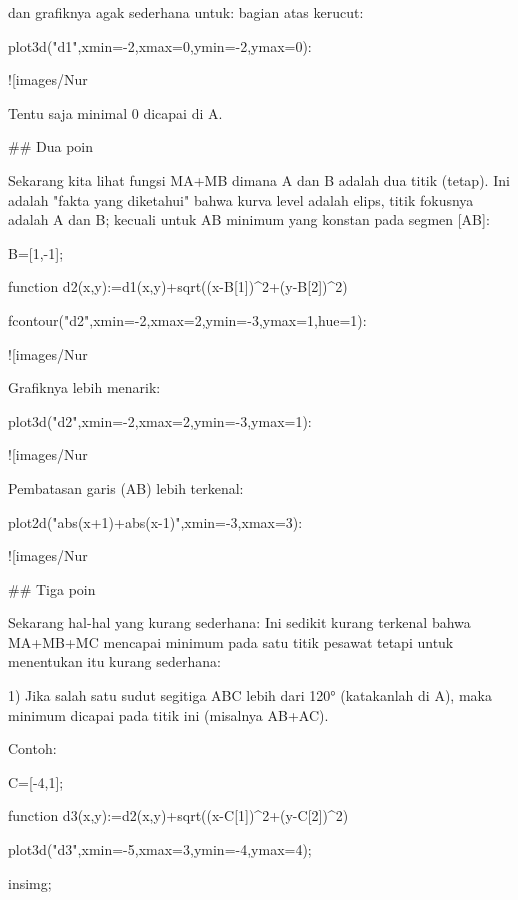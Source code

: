 \documentclass{article}
\begin{document}
dan grafiknya agak sederhana untuk: bagian atas kerucut:


\>plot3d("d1",xmin=-2,xmax=0,ymin=-2,ymax=0):


![images/Nur%

Tentu saja minimal 0 dicapai di A.


## Dua poin

Sekarang kita lihat fungsi MA+MB dimana A dan B adalah dua titik
(tetap). Ini adalah "fakta yang diketahui" bahwa kurva level adalah
elips, titik fokusnya adalah A dan B; kecuali untuk AB minimum yang
konstan pada segmen [AB]:


\>B=[1,-1];

\>function d2(x,y):=d1(x,y)+sqrt((x-B[1])^2+(y-B[2])^2)

\>fcontour("d2",xmin=-2,xmax=2,ymin=-3,ymax=1,hue=1):


![images/Nur%

Grafiknya lebih menarik:


\>plot3d("d2",xmin=-2,xmax=2,ymin=-3,ymax=1):


![images/Nur%

Pembatasan garis (AB) lebih terkenal:


\>plot2d("abs(x+1)+abs(x-1)",xmin=-3,xmax=3):


![images/Nur%

## Tiga poin



Sekarang hal-hal yang kurang sederhana: Ini sedikit kurang terkenal
bahwa MA+MB+MC mencapai minimum pada satu titik pesawat tetapi untuk
menentukan itu kurang sederhana:


1) Jika salah satu sudut segitiga ABC lebih dari 120° (katakanlah di
A), maka minimum dicapai pada titik ini (misalnya AB+AC).


Contoh:


\>C=[-4,1];

\>function d3(x,y):=d2(x,y)+sqrt((x-C[1])^2+(y-C[2])^2)

\>plot3d("d3",xmin=-5,xmax=3,ymin=-4,ymax=4);

\>insimg;
\end{document}
